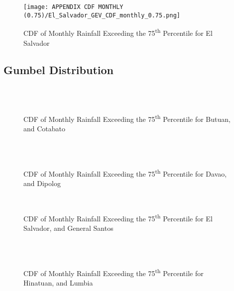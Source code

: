 \begin{figure}[H]
    \centering
    \texttt{[image: APPENDIX CDF MONTHLY (0.75)/El\_Salvador\_GEV\_CDF\_monthly\_0.75.png]}
    \caption{CDF of Monthly Rainfall Exceeding the 75\textsuperscript{th} Percentile for El Salvador}
    \label{fig:CDF_ElSal_GEV}
\end{figure}


\subsection{Gumbel Distribution}

\begin{figure}[H]
  \centering
  \\
  \\
\caption{CDF of Monthly Rainfall Exceeding the 75\textsuperscript{th} Percentile for Butuan, and Cotabato}
  \label{fig:monthly_0.75_appendix_gb_pt1}
\end{figure}

\begin{figure}[H]
  \centering
  \\
  \\
\caption{CDF of Monthly Rainfall Exceeding the 75\textsuperscript{th} Percentile for Davao, and Dipolog}
  \label{fig:monthly_0.75_appendix_gb_pt2}
\end{figure}

\begin{figure}[H]
  \centering
  \\
  \caption{CDF of Monthly Rainfall Exceeding the 75\textsuperscript{th} Percentile for El Salvador, and General Santos}
  \label{fig:monthly_0.75_appendix_gb_pt3}
\end{figure}

\begin{figure}[H]
  \centering
  \\
  \\
\caption{CDF of Monthly Rainfall Exceeding the 75\textsuperscript{th} Percentile for Hinatuan, and Lumbia}
  \label{fig:monthly_0.75_appendix_gb_pt4}
\end{figure}

